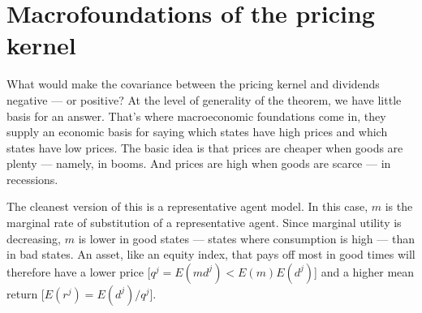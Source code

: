 \documentclass[11pt]{article}
\begin{document}
\section{Macrofoundations of the pricing kernel}

What would make the covariance between the pricing kernel and dividends negative --- or positive?
At the level of generality of the theorem, we have little basis for an answer.
That's where macroeconomic foundations come in, they supply an economic basis
for saying which states have high prices
and which states have low prices.
The basic idea is that prices are cheaper when goods are plenty ---
namely, in booms.
And prices are high when goods are scarce --- in recessions.

The cleanest version of this is a representative agent model.
In this case, $m$ is the marginal rate of substitution of a representative agent.
Since marginal utility is decreasing, $m$ is lower in
good states --- states where consumption is high ---
than in bad states.
An asset, like an equity index, that pays off most in good times
will therefore have a lower price [$q^j = E(md^j) < E(m) E(d^j)$]
and a higher mean return [$E(r^j) = E(d^j)/q^j$].
\end{document}
